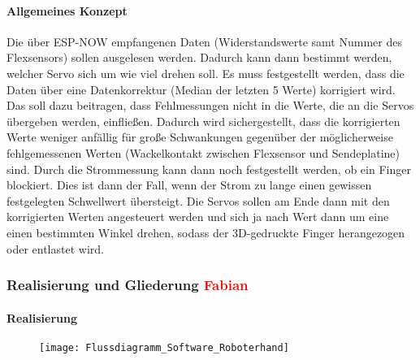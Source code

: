 \documentclass[titlepage,12pt,twoside]{article}
\begin{document}
\paragraph{Allgemeines Konzept}
\hfill \break
\hfill \break
Die über ESP-NOW empfangenen Daten (Widerstandswerte samt Nummer des Flexsensors) sollen ausgelesen werden. Dadurch kann dann 
bestimmt werden, welcher Servo sich um wie viel drehen soll. Es muss festgestellt werden, dass die Daten über eine 
Datenkorrektur (Median der letzten 5 Werte) korrigiert wird. Das soll dazu beitragen, dass Fehlmessungen nicht in die Werte, 
die an die Servos übergeben werden, einfließen. Dadurch wird sichergestellt, dass die korrigierten Werte weniger anfällig für 
große Schwankungen gegenüber der möglicherweise fehlgemessenen Werten (Wackelkontakt zwischen Flexsensor und Sendeplatine) sind. 
Durch die Strommessung kann dann noch festgestellt werden, ob ein Finger blockiert. Dies ist dann der Fall, wenn der Strom zu 
lange einen gewissen festgelegten Schwellwert übersteigt. Die Servos sollen am Ende dann mit den korrigierten Werten angesteuert 
werden und sich ja nach Wert dann um eine einen bestimmten Winkel drehen, sodass der 3D-gedruckte Finger herangezogen oder
entlastet wird.
\\

\subsubsection{Realisierung und Gliederung \textcolor{red}{Fabian}}
\paragraph{Realisierung}
\hfill \break
\hfill \break
\begin{figure}[H]
	\begin{center}
		\scalebox{0.5}
		{\texttt{[image: Flussdiagramm\_Software\_Roboterhand]}}
	\end{center}
\end{figure}
\end{document}
